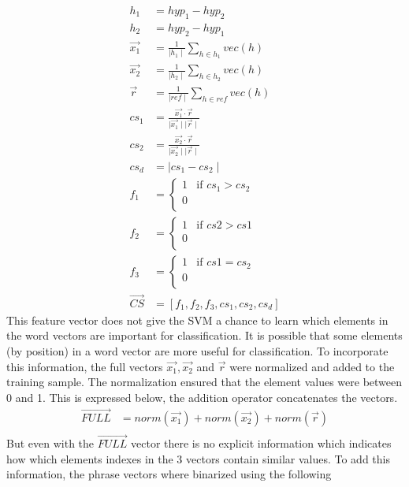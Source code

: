 \documentclass[11pt]{article}
\begin{document}
\begin{align*}
h_1 &= hyp_1 - hyp_2\\
h_2 &= hyp_2 - hyp_1\\
\vec{x_1} &= \frac{1}{\mid h_1 \mid} \sum \limits_{h\in h_1} vec(h)\\
\vec{x_2} &= \frac{1}{\mid h_2 \mid} \sum \limits_{h\in h_2} vec(h)\\
\vec{r} &= \frac{1}{\mid ref \mid} \sum \limits_{h \in ref} vec(h)\\
cs_1 &= \frac{\vec{x_1}\cdot\vec{r}}{\mid \vec{x_1}\mid \mid \vec{r} \mid}\\
cs_2 &= \frac{\vec{x_2}\cdot\vec{r}}{\mid \vec{x_2}\mid \mid \vec{r} \mid}\\
cs_d &= \mid cs_1 - cs_2 \mid\\
f_1 &= \begin{cases} 1 &\mbox{if } cs_1 > cs_2 \\
0 \\
\end{cases}\\
f_2 &= \begin{cases} 1 &\mbox{if } cs2 > cs 1\\
0\\
\end{cases}\\
f_3 &= \begin{cases} 1 &\mbox{if } cs1 =cs_2\\
0\\
\end{cases}\\
\vec{CS} &= [f_1, f_2, f_3, cs_1, cs_2, cs_d]
\end{align*}
This feature vector does not give the SVM a chance to learn which elements in
the word vectors are important for classification. It is possible that some
elements (by position) in a word vector are more useful for classification. To
incorporate this information, the full vectors $\vec{x_1}, \vec{x_2}$ and
$\vec{r}$ were normalized and added to the training sample. The normalization
ensured that the element values were between 0 and 1. This is expressed below,
the addition operator concatenates the vectors.
\begin{align*}
\vec{FULL} &= norm(\vec{x_1}) +norm(\vec{x_2})+ norm(\vec{r})\\ 
\end{align*}
But even with the $\vec{FULL}$ vector there is no explicit information which
indicates how which elements indexes in the 3 vectors contain similar values. To
add this information, the phrase vectors where binarized using the following
\end{document}
